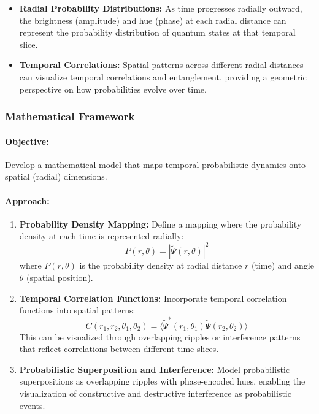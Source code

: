 \documentclass[12pt]{article}
\begin{document}
\begin{itemize}
    \item \textbf{Radial Probability Distributions:} As time progresses radially outward, the brightness (amplitude) and hue (phase) at each radial distance can represent the probability distribution of quantum states at that temporal slice.
    
    \item \textbf{Temporal Correlations:} Spatial patterns across different radial distances can visualize temporal correlations and entanglement, providing a geometric perspective on how probabilities evolve over time.
\end{itemize}

\subsubsection{Mathematical Framework}
\paragraph{Objective:} Develop a mathematical model that maps temporal probabilistic dynamics onto spatial (radial) dimensions.

\paragraph{Approach:}
\begin{enumerate}
    \item \textbf{Probability Density Mapping:}
    Define a mapping where the probability density at each time is represented radially:
    \[
    P(r, \theta) = |\tilde{\Psi}(r, \theta)|^2
    \]
    where \(P(r, \theta)\) is the probability density at radial distance \(r\) (time) and angle \(\theta\) (spatial position).
    
    \item \textbf{Temporal Correlation Functions:}
    Incorporate temporal correlation functions into spatial patterns:
    \[
    C(r_1, r_2, \theta_1, \theta_2) = \langle \tilde{\Psi}^*(r_1, \theta_1) \tilde{\Psi}(r_2, \theta_2) \rangle
    \]
    This can be visualized through overlapping ripples or interference patterns that reflect correlations between different time slices.
    
    \item \textbf{Probabilistic Superposition and Interference:}
    Model probabilistic superpositions as overlapping ripples with phase-encoded hues, enabling the visualization of constructive and destructive interference as probabilistic events.
\end{enumerate}
\end{document}
